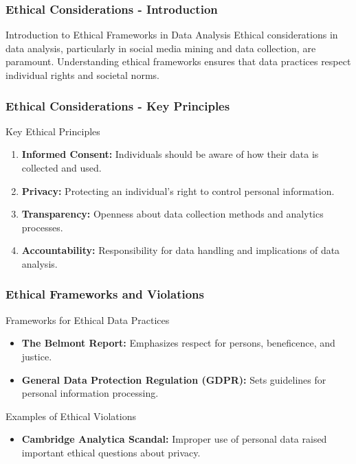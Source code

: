 \documentclass{beamer}
\begin{document}
\begin{frame}[fragile]
    \frametitle{Ethical Considerations - Introduction}
    \begin{block}{Introduction to Ethical Frameworks in Data Analysis}
        Ethical considerations in data analysis, particularly in social media mining and data collection, are paramount. Understanding ethical frameworks ensures that data practices respect individual rights and societal norms.
    \end{block}
\end{frame}

\begin{frame}[fragile]
    \frametitle{Ethical Considerations - Key Principles}
    \begin{block}{Key Ethical Principles}
        \begin{enumerate}
            \item \textbf{Informed Consent:} 
                Individuals should be aware of how their data is collected and used.
            \item \textbf{Privacy:} 
                Protecting an individual's right to control personal information.
            \item \textbf{Transparency:} 
                Openness about data collection methods and analytics processes.
            \item \textbf{Accountability:} 
                Responsibility for data handling and implications of data analysis.
        \end{enumerate}
    \end{block}
\end{frame}

\begin{frame}[fragile]
    \frametitle{Ethical Frameworks and Violations}
    \begin{block}{Frameworks for Ethical Data Practices}
        \begin{itemize}
            \item \textbf{The Belmont Report:} Emphasizes respect for persons, beneficence, and justice.
            \item \textbf{General Data Protection Regulation (GDPR):} 
                Sets guidelines for personal information processing.
        \end{itemize}
    \end{block}

    \begin{block}{Examples of Ethical Violations}
        \begin{itemize}
            \item \textbf{Cambridge Analytica Scandal:} Improper use of personal data raised important ethical questions about privacy.
        \end{itemize}
    \end{block}
\end{frame}
\end{document}
